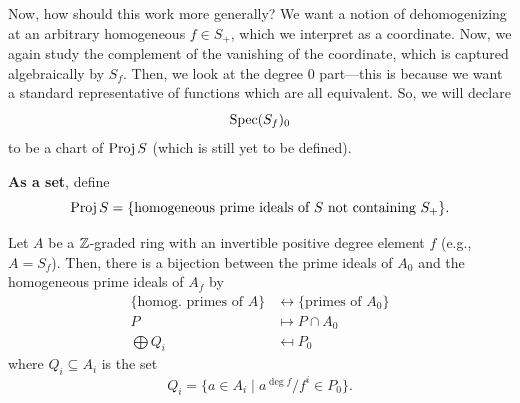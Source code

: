 \documentclass[12pt]{article}
\begin{document}
Now, how should this work more generally? We want a notion of dehomogenizing at an arbitrary homogeneous $f\in S_+$, which we interpret as a coordinate. Now, we again study the complement of the vanishing of the coordinate, which is captured algebraically by $S_f$. Then, we look at the degree 0 part---this is because we want a standard representative of functions which are all equivalent. So, we will declare
\[\operatorname{Spec} (S_f)_0\]
to be a chart of $\operatorname{Proj} S$ (which is still yet to be defined).

\textbf{As a set}, define
\[\operatorname{Proj} S = \{\text{homogeneous prime ideals of $S$ not containing $S_+$}\}.\]

\begin{prop}
    Let $A$ be a $\mathbb{Z}$-graded ring with an invertible positive degree element $f$ (e.g., $A=S_f$). Then, there is a bijection between the prime ideals of $A_0$ and the homogeneous prime ideals of $A_f$ by
    \begin{align*}
        \{\text{homog. primes of $A$}\} &\leftrightarrow \{\text{primes of $A_0$}\}\\
        P &\mapsto P\cap A_0\\
        \bigoplus Q_i &\mapsfrom P_0
    \end{align*}
    where $Q_i\subseteq A_i$ is the set
    \[Q_i = \{a \in A_i \mid a^{\deg f}/f^i \in P_0\}.\]
\end{prop}
\end{document}
